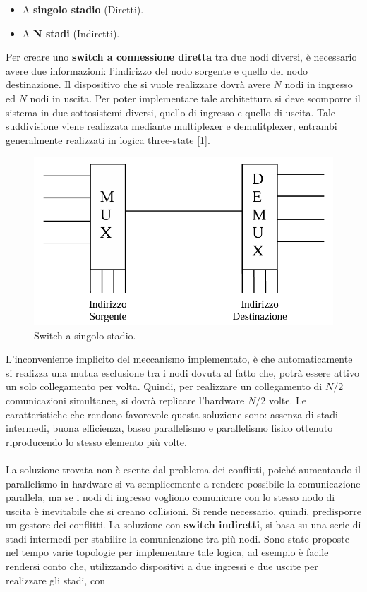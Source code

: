 \begin{itemize}
    \item A \textbf{singolo stadio} (Diretti).
    \item A \textbf{N stadi} (Indiretti).
\end{itemize}
Per creare uno \textbf{switch a connessione diretta} tra due nodi diversi, è necessario avere due informazioni: l'indirizzo del nodo sorgente e quello del nodo destinazione. Il dispositivo che si vuole realizzare dovrà avere \(N\) nodi in ingresso ed \(N\) nodi in uscita. Per poter implementare tale architettura si deve scomporre il sistema in due sottosistemi diversi, quello di ingresso e quello di uscita. Tale suddivisione viene realizzata mediante multiplexer e demulitplexer, entrambi generalmente realizzati in logica three-state [\ref{fig:switch-dir}]. 
\begin{figure}[!h]
    \centering
    \includegraphics[width=0.35\linewidth]{img/switch_dir.png}
    \caption{Switch a singolo stadio.}
    \label{fig:switch-dir}
\end{figure}
L'inconveniente implicito del meccanismo implementato, è che automaticamente si realizza una mutua esclusione tra i nodi dovuta al fatto che, potrà essere attivo un solo collegamento per volta. Quindi, per realizzare un collegamento di \(N/2\) comunicazioni simultanee, si dovrà replicare l'hardware \(N/2\) volte. Le caratteristiche che rendono favorevole questa soluzione sono: assenza di stadi intermedi, buona efficienza, basso parallelismo e parallelismo fisico ottenuto riproducendo lo stesso elemento più volte.
\\
\\
La soluzione trovata non è esente dal problema dei conflitti, poiché aumentando il parallelismo in 
hardware si va semplicemente a rendere possibile la comunicazione parallela, ma se i nodi di 
ingresso vogliono comunicare con lo stesso nodo di uscita è inevitabile che si creano collisioni. 
Si rende necessario, quindi, predisporre un gestore dei conflitti. La soluzione con \textbf{switch indiretti}, si basa su una serie di stadi intermedi per stabilire la comunicazione tra più nodi. Sono state proposte nel tempo varie topologie per implementare tale logica, ad esempio è facile rendersi conto che, utilizzando dispositivi a due ingressi e due uscite per realizzare gli stadi, con 
